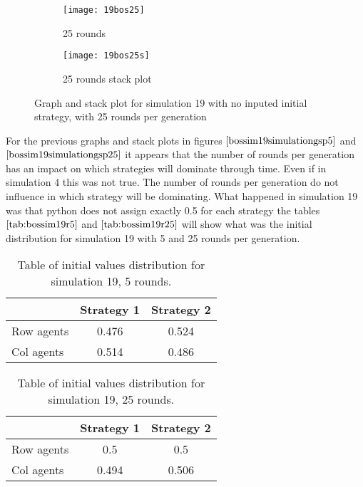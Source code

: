 \begin{figure}[H]       
    \centering
    \begin{subfigure}[b]{0.4\textwidth}
	\centering
	{\texttt{[image: 19bos25]}}   
    	\caption{25 rounds}
	\label{fig:bossim19r25}
    \end{subfigure}
    \hfill
    \begin{subfigure}[b]{0.4\textwidth}
	\centering
	{\texttt{[image: 19bos25s]}}   
    	\caption{25 rounds stack plot}
	\label{fig:bossim19rs25}
    \end{subfigure}
    \caption{Graph and stack plot for simulation 19 with no inputed initial strategy, with 25 rounds per generation}
    \label{bossim19simulationgsp25}
\end{figure}
For the previous graphs and stack plots in figures $\ref{bossim19simulationgsp5}$ and $\ref{bossim19simulationgsp25}$  it appears that the number of rounds per generation has an impact on which strategies will dominate through time. Even if  in simulation 4 this was not true. The number of rounds per generation do not influence in which strategy will be dominating. What happened in simulation 19 was that python does not assign exactly 0.5 for each strategy the tables $\ref{tab:bossim19r5}$ and $\ref{tab:bossim19r25}$  will show what was the initial distribution for simulation 19 with 5 and 25 rounds per generation.

\begin{table}[H]
\begin{center}
\begin{tabular}{|l|c|c|}
\hline
 & Strategy 1 & Strategy 2\\ 
\hline
Row agents & 0.476 & 0.524 \\
\hline
Col agents & 0.514 & 0.486\\
\hline
\end{tabular}
\caption{ Table of initial values distribution for simulation 19, 5 rounds.}
\label{tab:bossim19r5}	
\end{center}
\end{table}

\begin{table}[H]
\begin{center}
\begin{tabular}{|l|c|c|}
\hline
 & Strategy 1 & Strategy 2\\ 
\hline
Row agents &  0.5 & 0.5\\
\hline
Col agents &  0.494 & 0.506\\
\hline
\end{tabular}
\caption{ Table of initial values distribution for simulation 19, 25 rounds.}
\label{tab:bossim19r25}	
\end{center}
\end{table}

